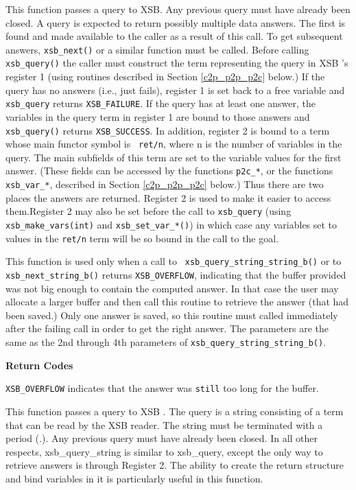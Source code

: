\begin{description}
  
%
This function passes a query to XSB.  Any previous query must have
already been closed.  A query is expected to return possibly multiple
data answers.  The first is found and made available to the caller as
a result of this call.  To get subsequent answers, {\tt xsb\_next()}
or a similar function must be called.  Before calling {\tt
  xsb\_query()} the caller must construct the term representing the
query in XSB 's register 1 (using routines described in Section
\ref{c2p_p2p_p2c} below.)  If the query has no answers (i.e., just
fails), register 1 is set back to a free variable and {\tt xsb\_query}
returns {\tt XSB\_FAILURE}.  If the query has at least one answer, the
variables in the query term in register 1 are bound to those answers
and {\tt xsb\_query()} returns {\tt XSB\_SUCCESS}.  In addition,
register 2 is bound to a term whose main functor symbol is {\tt
  ret/n}, where n is the number of variables in the query. The main
subfields of this term are set to the variable values for the first
answer. (These fields can be accessed by the functions {\tt p2c\_*},
or the functions {\tt xsb\_var\_*}, described in Section
\ref{c2p_p2p_p2c} below.)  Thus there are two places the answers are
returned. Register 2 is used to make it easier to access them.Register
2 may also be set before the call to {\tt xsb\_query} (using {\tt
  xsb\_make\_vars(int)} and {\tt xsb\_set\_var\_*()}) in which case
any variables set to values in the {\tt ret/n} term will be so bound
in the call to the goal.

  
%
This function is used only when a call to {\tt
  xsb\_query\_string\_string\_b()} or to {\tt xsb\_next\_string\_b()}
returns {\tt XSB\_OVERFLOW}, indicating that the buffer provided was
not big enough to contain the computed answer.  In that case the user
may allocate a larger buffer and then call this routine to retrieve
the answer (that had been saved.)  Only one answer is saved, so this
routine must called immediately after the failing call in order to get
the right answer.  The parameters are the same as the 2nd through 4th
parameters of {\tt xsb\_query\_string\_string\_b()}.

{\bf Return Codes}  
\bi
\item {\tt XSB\_OVERFLOW} indicates that the answer was {\tt still}
  too long for the buffer.  
\ei

 This function passes a query to
XSB .  The query is a string consisting of a term that can be read by
the XSB reader.  The string must be terminated with a period (.).  Any
previous query must have already been closed.  In all other respects,
xsb\_query\_string is similar to xsb\_query, except the only way to
retrieve answers is through Register 2.  The ability to create the
return structure and bind variables in it is particularly useful in
this function.


\end{description}
